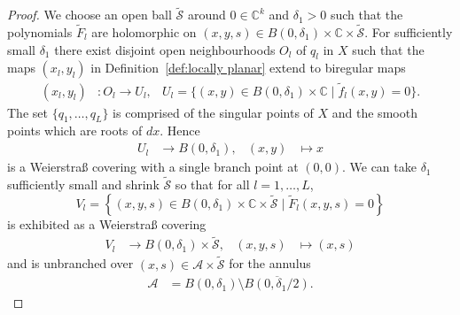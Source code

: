 \documentclass[11pt,twoside]{amsart}
\theoremstyle{plain}
\newcommand{\Am}{\mathcal{A}}
\newcommand{\Sm}{\mathcal{S}}
\newcommand{\dfx}{dx}
\begin{document}
\begin{proof}
We choose an open ball $\tilde{\Sm}$ around $0\in\mathbb{C}^k$ and $\delta_1>0$ such that the polynomials $\tilde{F}_l$ are holomorphic on $(x, y,s)\in B(0,\delta_1)\times\mathbb{C}\times\tilde{\Sm}$. For sufficiently small $\delta_1$ there exist disjoint open neighbourhoods $O_l$ of $q_l$ in $X$ such that the maps $(x_l, y_l)$ in Definition~\ref{def:locally planar} extend to biregular maps
\begin{align}\label{eq:map b2}
(x_l,y_l)&:O_l\to U_l,&
U_l=\{(x, y)\in B(0,\delta_1)\times\mathbb{C}\mid \tilde{f}_l(x, y)=0\}.
\end{align}
The set $\{q_1,\ldots,q_L\}$ is comprised of the singular points of $X$ and the smooth points which are roots of $\dfx$. Hence 
\begin {align}\label{covering 1}
U_l &\rightarrow B(0,\delta_1),&(x, y) &\mapsto x
\end {align}
is a Weierstra{\ss} covering 
with a single branch point at $(0,0)$. We can take $\delta_1$ sufficiently small and shrink $\tilde{\Sm}$ so that for all $l=1,\ldots,L$,
\[V_l=\left\{(x, y,s)\in B(0,\delta_1)\times\mathbb{C}\times\tilde{\Sm}\mid \tilde{F}_l(x,y,s)=0\right\}\]
is exhibited as a Weierstra{\ss} covering 
\begin{align}\label{covering 2}V_l &\rightarrow B(0,\delta_1)\times\tilde{\Sm},&(x,y,s) &\mapsto(x,s)
\end{align}
and is unbranched over $(x,s)\in\Am\times\tilde{\Sm}$ for the annulus 
\begin{align*}%
\Am&=B(0,\delta_1)\setminus\overline{B(0,\delta_1/2)}.
\end{align*}


\end{proof}
\end{document}
